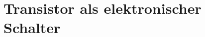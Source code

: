 \section{Transistor als elektronischer Schalter} %
\label{sec:Transistor_als_elektronischer_Schalter}



